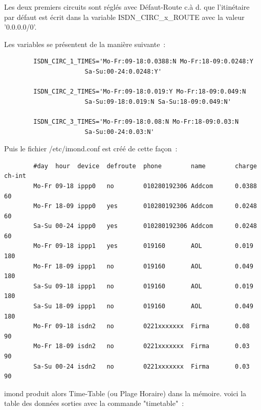   Les deux premiers circuits sont réglés avec Défaut-Route c.à d.
  que l'itinétaire par défaut est écrit dans la variable
  ISDN\_CIRC\_x\_ROUTE avec la valeur '0.0.0.0/0'.

  Les variables  se présentent de la manière suivante~:

\begin{example}
\begin{verbatim}
        ISDN_CIRC_1_TIMES='Mo-Fr:09-18:0.0388:N Mo-Fr:18-09:0.0248:Y
                      Sa-Su:00-24:0.0248:Y'

        ISDN_CIRC_2_TIMES='Mo-Fr:09-18:0.019:Y Mo-Fr:18-09:0.049:N
                      Sa-Su:09-18:0.019:N Sa-Su:18-09:0.049:N'

        ISDN_CIRC_3_TIMES='Mo-Fr:09-18:0.08:N Mo-Fr:18-09:0.03:N
                      Sa-Su:00-24:0.03:N'
\end{verbatim}
\end{example}

  Puis le fichier /etc/imond.conf est créé de cette façon~:

\begin{example}
\begin{verbatim}
        #day  hour  device  defroute  phone        name        charge  ch-int
        Mo-Fr 09-18 ippp0   no        010280192306 Addcom      0.0388   60
        Mo-Fr 18-09 ippp0   yes       010280192306 Addcom      0.0248   60
        Sa-Su 00-24 ippp0   yes       010280192306 Addcom      0.0248   60
        Mo-Fr 09-18 ippp1   yes       019160       AOL         0.019   180
        Mo-Fr 18-09 ippp1   no        019160       AOL         0.049   180
        Sa-Su 09-18 ippp1   no        019160       AOL         0.019   180
        Sa-Su 18-09 ippp1   no        019160       AOL         0.049   180
        Mo-Fr 09-18 isdn2   no        0221xxxxxxx  Firma       0.08     90
        Mo-Fr 18-09 isdn2   no        0221xxxxxxx  Firma       0.03     90
        Sa-Su 00-24 isdn2   no        0221xxxxxxx  Firma       0.03     90
\end{verbatim}
\end{example}

  imond produit alors Time-Table (ou Plage Horaire) dans la mémoire.
  voici la table des données sorties avec la commande "timetable"~:

